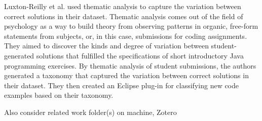 \begin{comment}
Braun and Clarke \cite{thematic06} argue that its application to qualitative data outside psychological research is justified. It is in direct contrast to methods in which a hypothesis or theory is first declared, and then evidence for and against it is gathered from the data. 
\end{comment}

Luxton-Reilly et al. \cite{Luxton13} used thematic analysis to capture the variation between correct solutions in their dataset. Thematic analysis comes out of the field of psychology as a way to build theory from observing patterns in organic, free-form statements from subjects, or, in this case, submissions for coding assignments. They aimed to discover the kinds and degree of variation between student-generated solutions that fulfilled the specifications of short introductory Java programming exercises. By thematic analysis of student submissions, the authors generated a taxonomy that captured the variation between correct solutions in their dataset. They then created an Eclipse plug-in for classifying new code examples based on their taxonomy. 










Also consider related work folder(s) on machine, Zotero




